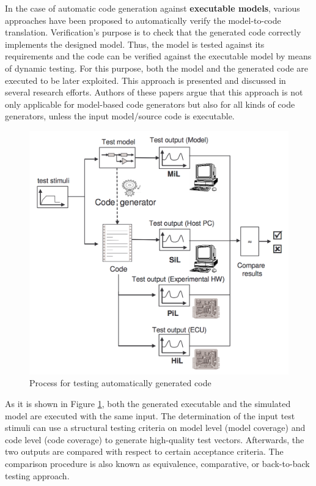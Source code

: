 In the case of automatic code generation against \textbf{executable models}, various approaches have been proposed to automatically verify the model-to-code translation. Verification's purpose is to check that the generated code correctly implements the designed model. Thus, the model is tested against its requirements and the code can be verified against the executable model by means of dynamic testing. For this purpose, both the model and the generated code are executed to be later exploited. This approach is presented and discussed in several research efforts\cite{sturmer2005overview,stuermer2007systematic,conrad2010code,jorges2014back,burnard2004verifying}. Authors of these papers argue that this approach is not only applicable for model-based code generators but also for all kinds of code generators, unless the input model/source code is executable.

\begin{figure}[h]
	\center
	\includegraphics[scale=0.6]{SOTA/fig/testing_process}
	\caption{Process for testing automatically generated code}
	\label{fig:Process for testing automatically generated code}
\end{figure}

As it is shown in Figure \ref{fig:Process for testing automatically generated code}, both the generated executable and the simulated model are executed with the same input. 
The determination of the input test stimuli can use a structural testing criteria on model level (model coverage) and code level (code coverage) to generate high-quality test vectors.
Afterwards, the two outputs are compared with respect
to certain acceptance criteria. The comparison procedure is also known as equivalence, comparative, or back-to-back testing approach\cite{vouk1990back,mckeeman1998differential}.
 
